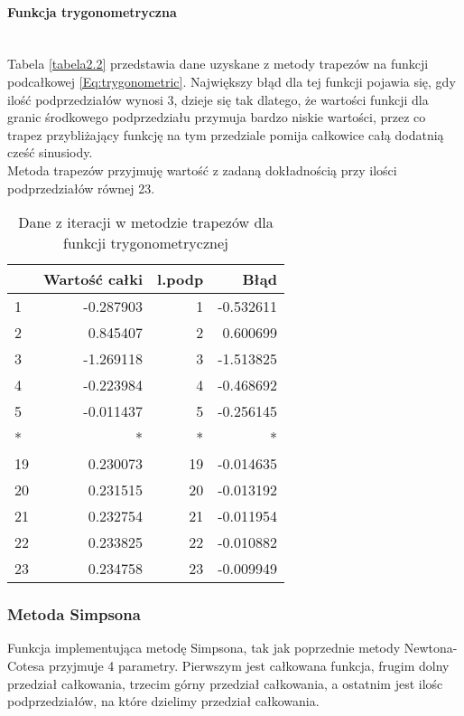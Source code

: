 \documentclass[12pt,twoside]{article}
\begin{document}
\paragraph{Funkcja trygonometryczna}\mbox{} \\

Tabela \eqref{tabela2.2} przedstawia dane uzyskane z metody trapezów na funkcji podcałkowej \eqref{Eq:trygonometric}. Największy błąd dla tej funkcji pojawia się, gdy ilość podprzedziałów wynosi 3, dzieje się tak dlatego, że wartości funkcji dla granic środkowego podprzedziału przymuja bardzo niskie wartości, przez co trapez przybliżający funkcję na tym przedziale pomija całkowice całą dodatnią cześć sinusiody.\\
Metoda trapezów przyjmuję wartość z zadaną dokładnością przy ilości podprzedziałów równej 23.


\begin{table}[h!]
\centering 
\caption{Dane z iteracji w metodzie trapezów dla funkcji trygonometrycznej}
\label{tabela2.2}
\begin{tabular}{lrrr}
\toprule
{} &  Wartość całki &  l.podp &      Błąd \\
\midrule
1  &      -0.287903 &       1 & -0.532611 \\
2  &       0.845407 &       2 &  0.600699 \\
3  &      -1.269118 &       3 & -1.513825 \\
4  &      -0.223984 &       4 & -0.468692 \\
5  &      -0.011437 &       5 & -0.256145 \\
*  &      *&       * & * \\
19 &       0.230073 &      19 & -0.014635 \\
20 &       0.231515 &      20 & -0.013192 \\
21 &       0.232754 &      21 & -0.011954 \\
22 &       0.233825 &      22 & -0.010882 \\
23 &       0.234758 &      23 & -0.009949 \\
\bottomrule
\end{tabular}
\end{table}


\subsubsection{Metoda Simpsona}

Funkcja implementująca metodę Simpsona, tak jak poprzednie metody Newtona-Cotesa przyjmuje 4 parametry. Pierwszym jest całkowana funkcja, frugim dolny przedział całkowania, trzecim górny przedział całkowania, a ostatnim jest ilośc podprzedziałów, na które dzielimy przedział całkowania.
\end{document}
